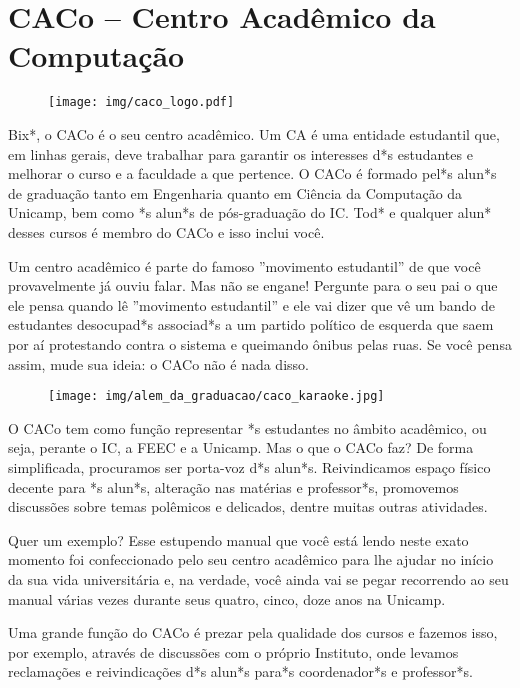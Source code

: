
\section{CACo -- Centro Acadêmico da Computação}

\begin{figure}[H]
    \centering
    \texttt{[image: img/caco\_logo.pdf]}
\end{figure}

Bix*, o CACo é o seu centro acadêmico. Um CA é uma entidade estudantil que, em
linhas gerais, deve trabalhar para garantir os interesses d*s estudantes e
melhorar o curso e a faculdade a que pertence. O CACo é formado pel*s alun*s de
graduação tanto em Engenharia quanto em Ciência da Computação da Unicamp, bem
como *s alun*s de pós-graduação do IC. Tod* e qualquer alun* desses cursos é
membro do CACo e isso inclui você.

Um centro acadêmico é parte do famoso ''movimento estudantil'' de que você
provavelmente já ouviu falar. Mas não se engane! Pergunte para o seu pai o que
ele pensa quando lê ''movimento estudantil'' e ele vai dizer que vê um bando de
estudantes desocupad*s associad*s a um partido político de esquerda que saem por
aí protestando contra o sistema e queimando ônibus pelas ruas. Se você pensa
assim, mude sua ideia: o CACo não é nada disso.

\begin{figure}[H]
    \centering
    \texttt{[image: img/alem\_da\_graduacao/caco\_karaoke.jpg]}
\end{figure}

O CACo tem como função representar *s estudantes no âmbito acadêmico, ou seja,
perante o IC, a FEEC e a Unicamp. Mas o que o CACo faz? De forma simplificada,
procuramos ser porta-voz d*s alun*s. Reivindicamos espaço físico decente para *s
alun*s, alteração nas matérias e professor*s, promovemos discussões sobre temas
polêmicos e delicados, dentre muitas outras atividades.

Quer um exemplo? Esse estupendo manual que você está lendo neste exato momento
foi confeccionado pelo seu centro acadêmico para lhe ajudar no início da sua
vida universitária e, na verdade, você ainda vai se pegar recorrendo ao seu
manual várias vezes durante seus quatro, cinco, doze anos na Unicamp.

Uma grande função do CACo é prezar pela qualidade dos cursos e fazemos isso, por
exemplo, através de discussões com o próprio Instituto, onde levamos reclamações
e reivindicações d*s alun*s para*s coordenador*s e professor*s.

